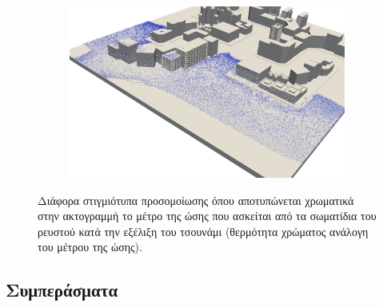 \begin{figure}
\begin{subfigure}{.5\textwidth}
  \end{subfigure}
  \begin{subfigure}{.5\textwidth}
    \centering
    \includegraphics[width=\textwidth]{figures/impulses-3.png}
  \end{subfigure}
  \caption[Ώσεις στην ακτογραμμή]{Διάφορα στιγμιότυπα προσομοίωσης όπου αποτυπώνεται
    χρωματικά στην ακτογραμμή το μέτρο της ώσης που ασκείται από τα σωματίδια του ρευστού
    κατά την εξέλιξη του τσουνάμι (θερμότητα χρώματος ανάλογη του μέτρου της ώσης).}
  \label{fig:impulses}
\end{figure}

\subsection{Συμπεράσματα}
